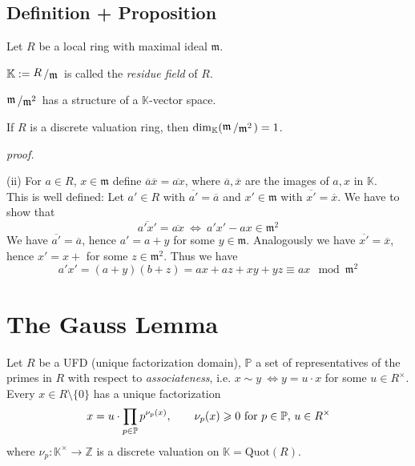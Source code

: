 \documentclass[12pt]{book}
\newcommand{\slant}[2]{{\raisebox{.1em}{$#1$}\left/\raisebox{-.1em}{$#2$}\right.}}
\begin{document}
\begin{spacing}{1.3}
\subsection{Definition + Proposition} %
Let $R$ be a local ring with maximal ideal $\mathfrak{m}$. 
\begin{compactenum}
\item $\mathbb{K}:= \slant{R}{\mathfrak{m}}$ is called the \textit{residue field} of $R$.
\item $\slant{\mathfrak{m}}{\mathfrak{m}^2}$ has a structure of a $\mathbb{K}$-vector space.
\item If $R$ is a discrete valuation ring, then $\dim_{\mathbb{K}}(\slant{\mathfrak{m}}{\mathfrak{m}^2})=1$.
\end{compactenum}
\pagebreak 
\textit{proof.}
\begin{compactenum}
\item[(ii)] For $a \in R$, $x \in \mathfrak{m}$ define $\overline{a} \overline{x}=\overline{ax}$, where $\overline{a}, \overline{x}$ are the images of $a,x$ in $\mathbb{K}$.\\
This is well defined: Let $a' \in R$ with $\overline{a'}=\overline{a}$ and $x'\in \mathfrak{m}$ with $\overline{x'}=\overline{x}$. We have to show that $$\overline{a'x'}=\overline{ax} \ \Longleftrightarrow \ a'x' - ax \in \mathfrak{m}^2$$
We have $\overline{a'}=\overline{a}$, hence $a'=a+y$ for some $y \in \mathfrak{m}$. Analogously we have $\overline{x'}=\overline{x}$, hence $x'=x+$ for some $z \in \mathfrak{m}^2$. Thus we have
$$a'x'=(a+y)(b+z)=ax+az+xy+yz \equiv ax \mod \mathfrak{m}^2$$
\end{compactenum}



\renewcommand*\thesection{\S\ \arabic{section}\quad}
\section{The Gauss Lemma}
\renewcommand*\thesection{\arabic{section}}

Let $R$ be a UFD (unique factorization domain), $\mathbb{P}$ a set of representatives of the primes in $R$ with respect to \textit{associateness}, i.e. $x \sim y \ \Leftrightarrow y=u\cdot x$ for some $u \in R^{\times}$.\\
Every $x \in R\setminus \{0\}$ has a unique factorization 
$$x=u \cdot \prod_{p \in \mathbb{P}} p^{\nu_p(x)}, \qquad  \nu_p(x) \geqslant 0 \textrm{ for } p \in \mathbb{P} \textrm, \ u \in R^{\times} $$
where $\nu_p: \mathbb{K}^{\times} \longrightarrow \mathbb{Z}$ is a discrete valuation on $\mathbb{K}=\textrm{Quot}(R)$.


\end{spacing}
\end{document}
